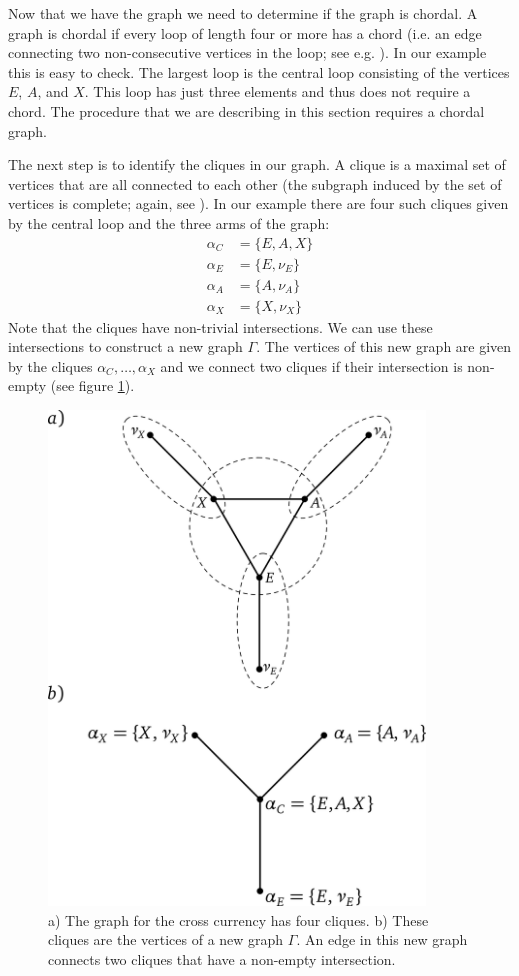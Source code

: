 \documentclass[11pt, a4paper]{article}
\begin{document}
Now that we have the graph we need to determine if the graph is chordal. A graph is chordal if every loop of length four or more has a chord (i.e. an edge connecting two non-consecutive vertices in the loop; see e.g. \cite{golumbic}). In our example this is easy to check. The largest loop is the central loop consisting of the vertices $E$, $A$, and $X$. This loop has just three elements and thus does not require a chord. The procedure that we are describing in this section requires a chordal graph.

The next step is to identify the cliques in our graph. A clique is a maximal set of vertices that are all connected to each other (the subgraph induced by the set of vertices is complete; again, see \cite{golumbic}). In our example there are four such cliques given by the central loop and the three arms of the graph:
\begin{align}
	\alpha_C & = \{E,A,X\}\\
	\alpha_E & = \{E,\nu_E\}\\
	\alpha_A & = \{A,\nu_A\}\\
	\alpha_X & = \{X,\nu_X\}
\end{align}  
Note that the cliques have non-trivial intersections. We can use these intersections to construct a new graph $\Gamma$. The vertices of this new graph are given by the cliques $\alpha_C, \ldots, \alpha_X$ and we connect two cliques if their intersection is non-empty (see figure \ref{fig.cliques}). 

\begin{figure}[hbt]
  \begin{center}
  	\includegraphics[width=10cm]{img/cliques.png}
  \end{center}
  \caption{a) The graph for the cross currency has four cliques. b) These cliques are the vertices of a new graph $\Gamma$. An edge in this new graph connects two cliques that have a non-empty intersection.}\label{fig.cliques}
\end{figure}
\end{document}
